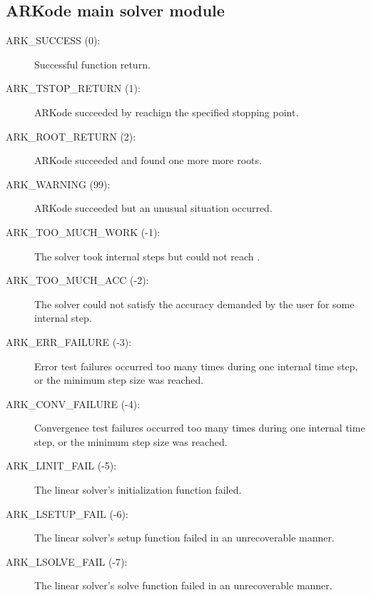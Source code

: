 \documentclass[letterpaper,10pt,english]{sphinxmanual}
\begin{document}
\subsection{ARKode main solver module}
\label{Constants:id1}\begin{description}
\item[{ARK\_SUCCESS  (0):}] \leavevmode
Successful function return.

\item[{ARK\_TSTOP\_RETURN  (1):}] \leavevmode
ARKode succeeded by reachign the specified
stopping point.

\item[{ARK\_ROOT\_RETURN  (2):}] \leavevmode
ARKode succeeded and found one more more roots.

\item[{ARK\_WARNING  (99):}] \leavevmode
ARKode succeeded but an unusual situation occurred.

\item[{ARK\_TOO\_MUCH\_WORK  (-1):}] \leavevmode
The solver took  internal steps
but could not reach .

\item[{ARK\_TOO\_MUCH\_ACC  (-2):}] \leavevmode
The solver could not satisfy the accuracy
demanded by the user for some internal step.

\item[{ARK\_ERR\_FAILURE  (-3):}] \leavevmode
Error test failures occurred too many times
during one internal time step, or the minimum step size was
reached.

\item[{ARK\_CONV\_FAILURE  (-4):}] \leavevmode
Convergence test failures occurred too many
times during one internal time step, or the minimum step size was
reached.

\item[{ARK\_LINIT\_FAIL  (-5):}] \leavevmode
The linear solver's initialization function failed.

\item[{ARK\_LSETUP\_FAIL  (-6):}] \leavevmode
The linear solver's setup function failed in
an unrecoverable manner.

\item[{ARK\_LSOLVE\_FAIL  (-7):}] \leavevmode
The linear solver's solve function failed in
an unrecoverable manner.


\end{description}
\end{document}
